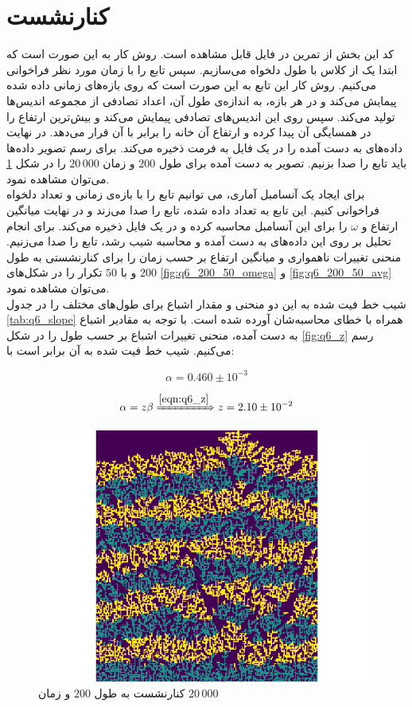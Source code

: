 \documentclass[11pt, a4paper]{article}
\begin{document}
\section{\textbf{کنارنشست}}
کد این بخش از تمرین در فایل
قابل مشاهده است. روش کار به این صورت است که ابتدا یک
از کلاس
با طول دلخواه می‌سازیم. سپس تابع
را با زمان مورد نظر فراخوانی می‌کنیم. روش کار این تابع به این صورت است که روی بازه‌های زمانی داده شده
پیمایش می‌کند و در هر بازه، به اندازه‌ی طول آن، اعداد تصادفی از مجموعه اندیس‌ها تولید می‌کند. 
سپس روی این اندیس‌های تصادفی پیمایش می‌کند و بیش‌ترین ارتفاع را در همسایگی آن پیدا کرده و ارتفاع آن خانه را برابر با آن قرار می‌دهد.
در نهایت داده‌های به دست آمده را در یک فایل به فرمت
ذخیره می‌کند.
برای رسم تصویر داده‌ها باید تابع
را صدا بزنیم.
تصویر به دست آمده برای طول
$200$
و زمان
$20\,000$
را در شکل
\ref{fig:q6_200_20000}
می‌توان مشاهده نمود.
\\
برای ایجاد یک آنسامبل آماری، می توانیم تابع
را با بازه‌ی زمانی و تعداد دلخواه فراخوانی کنیم. 
این تابع به تعداد داده شده، تابع
را صدا می‌زند و در نهایت میانگین ارتفاع و 
$\omega$
را برای این آنسامبل محاسبه کرده و در یک فایل ذخیره می‌کند.
برای انجام تحلیل بر روی این داده‌های به دست آمده و محاسبه شیب رشد، تابع
را صدا می‌زنیم.
منحنی تغییرات ناهمواری و میانگین ارتفاع بر حسب زمان را برای کنارنشستی به طول
$200$
و با
$50$
تکرار را در شکل‌های
\ref{fig:q6_200_50_omega}
و
\ref{fig:q6_200_50_avg}
می‌توان مشاهده نمود.
\\
شیب خط فیت شده به این دو منحنی و مقدار اشباع برای طول‌های مختلف را در جدول
\ref{tab:q6_slope}
همراه با خطا‌ی محاسبه‌شان آورده شده است.
با توجه به مقادیر اشباع به دست آمده، منحنی تغییرات اشباع بر حسب طول را در شکل
\ref{fig:q6_z}
رسم می‌کنیم. شیب خط فیت شده به آن برابر است با:

\begin{equation}
  \alpha = 0.460 \pm 10^{-3}
  \label{eqn:q6_z}
\end{equation}

\begin{equation}
  \alpha = z \beta
  \xRightarrow{\eqref{eqn:q6_z}}
  z = 2.10 \pm 10^{-2}
\end{equation}

\begin{figure}[h]
  \centering
  \includegraphics[width=.5\textwidth]{q6_200_20000.png}
  \caption{کنارنشست به طول $200$ و زمان $20\,000$}
  \label{fig:q6_200_20000}
\end{figure}
\end{document}
